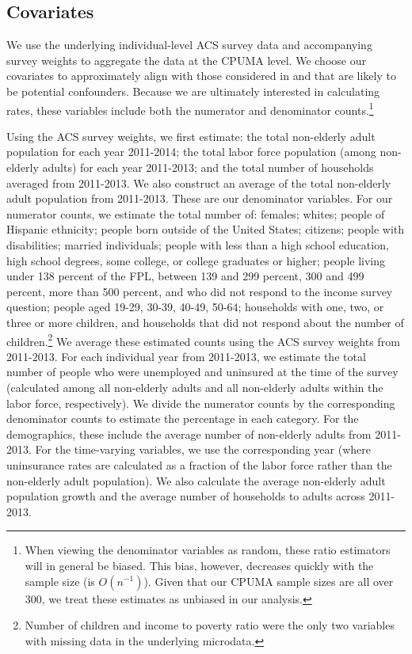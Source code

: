 \documentclass[aoas]{imsart}
\theoremstyle{plain}
\theoremstyle{remark}
\begin{document}
\subsection{Covariates}

We use the underlying individual-level ACS survey data and accompanying survey weights to aggregate the data at the CPUMA level. We choose our covariates to approximately align with those considered in \cite{courtemanche2017early} and that are likely to be potential confounders. Because we are ultimately interested in calculating rates, these variables include both the numerator and denominator counts.\footnote{When viewing the denominator variables as random, these ratio estimators will in general be biased. This bias, however, decreases quickly with the sample size (is $O(n^{-1})$). Given that our CPUMA sample sizes are all over 300, we treat these estimates as unbiased in our analysis.}

Using the ACS survey weights, we first estimate: the total non-elderly adult population for each year 2011-2014; the total labor force population (among non-elderly adults) for each year 2011-2013; and the total number of households averaged from 2011-2013. We also construct an average of the total non-elderly adult population from 2011-2013. These are our denominator variables. For our numerator counts, we estimate the total number of: females; whites; people of Hispanic ethnicity; people born outside of the United States; citizens; people with disabilities; married individuals; people with less than a high school education, high school degrees, some college, or college graduates or higher; people living under 138 percent of the FPL, between 139 and 299 percent, 300 and 499 percent, more than 500 percent, and who did not respond to the income survey question; people aged 19-29, 30-39, 40-49, 50-64; households with one, two, or three or more children, and households that did not respond about the number of children.\footnote{Number of children and income to poverty ratio were the only two variables with missing data in the underlying microdata.} We average these estimated counts using the ACS survey weights from 2011-2013. For each individual year from 2011-2013, we estimate the total number of people who were unemployed and uninsured at the time of the survey (calculated among all non-elderly adults and all non-elderly adults within the labor force, respectively). We divide the numerator counts by the corresponding denominator counts to estimate the percentage in each category. For the demographics, these include the average number of non-elderly adults from 2011-2013. For the time-varying variables, we use the corresponding year (where uninsurance rates are calculated as a fraction of the labor force rather than the non-elderly adult population). We also calculate the average non-elderly adult population growth and the average number of households to adults across 2011-2013. 
\end{document}
